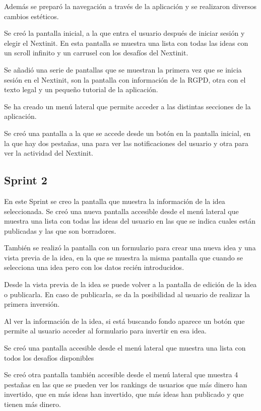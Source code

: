 Además se preparó la navegación a través de la aplicación y se realizaron diversos 
cambios estéticos.

Se creó la pantalla inicial, a la que entra el usuario después de iniciar sesión y elegir el 
Nextinit. En esta pantalla se muestra una lista con todas las ideas con un scroll infinito
y un carrusel con los desafíos del Nextinit.

Se añadió una serie de pantallas que se muestran la primera vez que se inicia sesión 
en el Nextinit, son la pantalla con información de la RGPD, otra con el texto legal y 
un pequeño tutorial de la aplicación.

Se ha creado un menú lateral que permite acceder a las distintas secciones de la 
aplicación.

Se creó una pantalla a la que se accede desde un botón en la pantalla inicial,
en la que hay dos pestañas, una para ver las notificaciones del usuario y otra para
ver la actividad del Nextinit.


\subsection{Sprint 2}

En este Sprint se creo la pantalla que muestra la información de la idea seleccionada. Se creó 
una nueva pantalla accesible desde el menú lateral que muestra una lista con todas las ideas 
del usuario en las que se indica cuales están publicadas y las que son borradores. 

También se realizó la pantalla con un formulario para crear una nueva idea y una vista previa 
de la idea, en la que se muestra la misma pantalla que cuando se selecciona una idea pero con 
los datos recién introducidos.

Desde la vista previa de la idea se puede volver a la pantalla de edición de la idea o publicarla. En 
caso de publicarla, se da la posibilidad al usuario de realizar la primera inversión.

Al ver la información de la idea, si está buscando fondo aparece un botón que permite al usuario 
acceder al formulario para invertir en esa idea.

Se creó una pantalla accesible desde el menú lateral que muestra una lista con todos los desafíos 
disponibles

Se creó otra pantalla también accesible desde el menú lateral que muestra 4 pestañas en las que se 
pueden ver los rankings de usuarios que más dinero han invertido, que en más ideas han invertido, 
que más ideas han publicado y que tienen más dinero.

